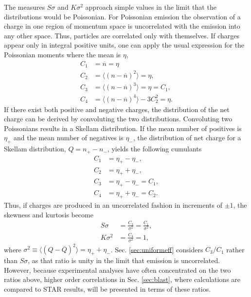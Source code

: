 The measures $S\sigma$ and $K\sigma^2$ approach simple values in the limit that the distributions would be Poissonian. For Poissonian emission the observation of a charge in one region of momentum space is uncorrelated with the emission into any other space. Thus, particles are correlated only with themselves. If charges appear only in integral positive units, one can apply the usual expression for the Poissonian moments where the mean is $\eta$, 
\begin{align}
C_1&=\overline{n}=\eta\\ \nonumber
C_2&=\langle(n-\overline{n})^2\rangle=\eta,\\ \nonumber
C_3&=\langle(n-\overline{n})^3\rangle=\eta=C_1,\\ \nonumber
C_4&=\langle(n-\overline{n})^4\rangle-3C_2^2=\eta. \nonumber
\end{align}
If there exist both positive and negative charges, the distribution of the net charge can be derived by convoluting the two distributions. Convoluting two Poissonians results in a Skellam distribution. If the mean number of positives is $\eta_+$ and the mean number of negatives is $\eta_-$, the distribution of net charge for a Skellam distribution, $Q=n_+-n_-$, yields the following cumulants
\begin{align}
\label{eq:skellam}
C_1&=\eta_+-\eta_-,\\ \nonumber
C_2&=\eta_++\eta_-,\\ \nonumber
C_3&=\eta_+-\eta_-=C_1,\\ \nonumber
C_4&=\eta_++\eta_-=C_2. \nonumber
\end{align}
Thus, if charges are produced in an uncorrelated fashion in increments of $\pm 1$, the skewness and kurtosis become
\begin{eqnarray}
S\sigma&=\frac{C_3}{\sigma^2}=\frac{C_1}{\sigma^2},\\ \nonumber
K\sigma^2&=\frac{C_4}{\sigma^2}=1, \nonumber
\end{eqnarray}
where $\sigma^2\equiv\langle(Q-\overline{Q})^2\rangle=\eta_++\eta_-$. Sec. \ref{sec:uniformeff} considers $C_3/C_1$ rather than $S\sigma$, as that ratio is unity in the limit that emission is uncorrelated. However, because experimental analyses have often concentrated on the two ratios above, higher order correlations in Sec. \ref{sec:blast}, where calculations are compared to STAR results, will be presented in terms of these ratios.

